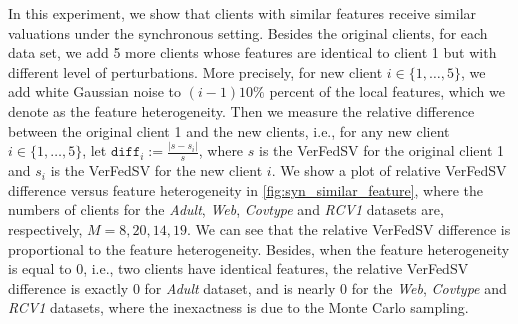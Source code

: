 In this experiment, we show that clients with similar features receive similar valuations under the synchronous setting. Besides the original clients, for each data set, we add 5 more clients whose features are identical to client 1 but with different level of perturbations. More precisely, for new client $i \in \{1,\dots,5\}$, we add white Gaussian noise to $(i-1)10\%$ percent of the local features, which we denote as the feature heterogeneity. Then we measure the relative difference between the original client 1 and the new clients, i.e., for any new client $i \in \{1,\dots,5\}$, let
$\texttt{diff}_i := \frac{|s - s_i|}{s}$,
where $s$ is the VerFedSV for the original client 1 and $s_i$ is the VerFedSV for the new client $i$. We show a plot of relative VerFedSV difference versus feature heterogeneity in \autoref{fig:syn_similar_feature}, where the numbers of clients for the \emph{Adult}, \emph{Web}, \emph{Covtype} and \emph{RCV1} datasets are, respectively, $M = 8, 20, 14, 19$. We can see that the relative VerFedSV difference is proportional to the feature heterogeneity. Besides, when the feature heterogeneity is equal to $0$, i.e., two clients have identical features, the relative VerFedSV difference is exactly $0$ for \emph{Adult} dataset, and is nearly $0$ for the \emph{Web}, \emph{Covtype} and \emph{RCV1} datasets, where the inexactness is due to the Monte Carlo sampling. 

